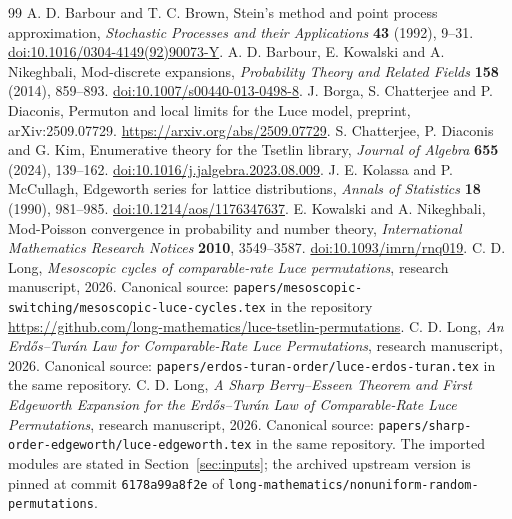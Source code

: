 \documentclass[11pt]{article}
\theoremstyle{remark}
\begin{document}
\begin{thebibliography}{99}
 A. D. Barbour and T. C. Brown, Stein's method and point process approximation, \emph{Stochastic Processes and their Applications} \textbf{43} (1992), 9--31. \href{https://doi.org/10.1016/0304-4149(92)90073-Y}{doi:10.1016/0304-4149(92)90073-Y}.
 A. D. Barbour, E. Kowalski and A. Nikeghbali, Mod-discrete expansions, \emph{Probability Theory and Related Fields} \textbf{158} (2014), 859--893. \href{https://doi.org/10.1007/s00440-013-0498-8}{doi:10.1007/s00440-013-0498-8}.
 J. Borga, S. Chatterjee and P. Diaconis, Permuton and local limits for the Luce model, preprint, arXiv:2509.07729. \url{https://arxiv.org/abs/2509.07729}.
 S. Chatterjee, P. Diaconis and G. Kim, Enumerative theory for the Tsetlin library, \emph{Journal of Algebra} \textbf{655} (2024), 139--162. \href{https://doi.org/10.1016/j.jalgebra.2023.08.009}{doi:10.1016/j.jalgebra.2023.08.009}.
 J. E. Kolassa and P. McCullagh, Edgeworth series for lattice distributions, \emph{Annals of Statistics} \textbf{18} (1990), 981--985. \href{https://doi.org/10.1214/aos/1176347637}{doi:10.1214/aos/1176347637}.
 E. Kowalski and A. Nikeghbali, Mod-Poisson convergence in probability and number theory, \emph{International Mathematics Research Notices} \textbf{2010}, 3549--3587. \href{https://doi.org/10.1093/imrn/rnq019}{doi:10.1093/imrn/rnq019}.
 C. D. Long, \emph{Mesoscopic cycles of comparable-rate Luce permutations}, research manuscript, 2026. Canonical source: \texttt{papers/mesoscopic-switching/mesoscopic-luce-cycles.tex} in the repository \url{https://github.com/long-mathematics/luce-tsetlin-permutations}.
 C. D. Long, \emph{An Erd\H{o}s--Tur\'an Law for Comparable-Rate Luce Permutations}, research manuscript, 2026. Canonical source: \texttt{papers/erdos-turan-order/luce-erdos-turan.tex} in the same repository.
 C. D. Long, \emph{A Sharp Berry--Esseen Theorem and First Edgeworth Expansion for the Erd\H{o}s--Tur\'an Law of Comparable-Rate Luce Permutations}, research manuscript, 2026. Canonical source: \texttt{papers/sharp-order-edgeworth/luce-edgeworth.tex} in the same repository. The imported modules are stated in Section~\ref{sec:inputs}; the archived upstream version is pinned at commit \texttt{6178a99a8f2e} of \texttt{long-mathematics/nonuniform-random-permutations}.
\end{thebibliography}
\end{document}
